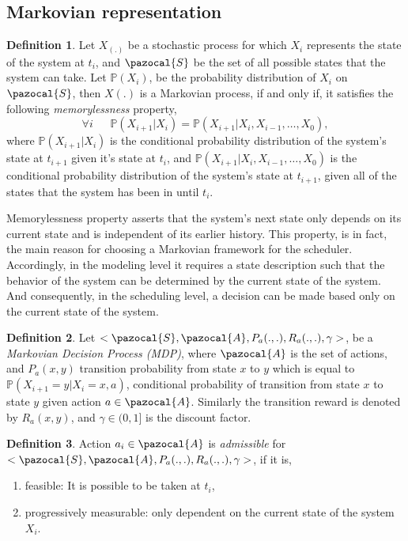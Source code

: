 \documentclass[11pt]{article}
\theoremstyle{definition}
\newtheorem{defn}{Definition}
\begin{document}
\subsection{Markovian representation}\label{sec_Markov}
\begin{defn}
Let $X_{(.)}$ be a stochastic process for which $X_i$ represents the state of the system at $t_i$, and $\pazocal{S}$ be the set of all possible states that the system can take. Let $\mathbb{P}(X_i)$, be the probability distribution of $X_i$ on $\pazocal{S}$, then $X(.)$ is a Markovian process, if and only if, it satisfies the following \textit{memorylessness} property,
\begin{equation*}
\forall i ~~~~~~~\mathbb{P}(X_{{i+1}} | X_{i}) = \mathbb{P}(X_{{i+1}} | X_{i}, X_{{i-1}},\dots, X_{0}),
\end{equation*}
where $\mathbb{P}(X_{{i+1}} | X_{i})$ is the conditional probability distribution of the system's state at $t_{i+1}$ given it's state at $t_i$, and $\mathbb{P}(X_{{i+1}} | X_{i}, X_{{i-1}},\dots, X_{0})$ is the conditional probability distribution of the system's state at $t_{i+1}$, given all of the states that the system has been in until $t_i$.
\end{defn}
Memorylessness property asserts that the system's next state only depends on its current state and is independent of its earlier history. This property, is in fact, the main reason for choosing a Markovian framework for the scheduler. Accordingly, in the modeling level it requires a state description such that the behavior of the system can be determined by the current state of the system. And consequently, in the scheduling level, a decision can be made based only on the current state of the system.
\begin{defn}
Let $<\pazocal{S},\pazocal{A}, P_a(.,.), R_a(.,.), \gamma>$, be a \textit{Markovian Decision Process (MDP)}, where $\pazocal{A}$ is the set of actions, and $P_a(x, y)$ transition probability from state $x$ to $y$ which is equal to $\mathbb{P}(X_{i+1}=y | X_i=x, a)$, conditional probability of transition from state $x$ to state $y$ given action $a \in  \pazocal{A}$. Similarly the transition reward is denoted by $R_a(x,y)$, and $\gamma \in (0,1]$ is the discount factor.
\end{defn}
\begin{defn}
Action $a_{i} \in \pazocal{A}$ is \textit{admissible} for $<\pazocal{S},\pazocal{A}, P_a(.,.), R_a(.,.), \gamma>$, if it is,
\begin{enumerate}
\item feasible: It is possible to be taken at $t_i$,
\item progressively measurable: only dependent on the current state of the system $X_i$.
\end{enumerate}
\end{defn}
\end{document}
